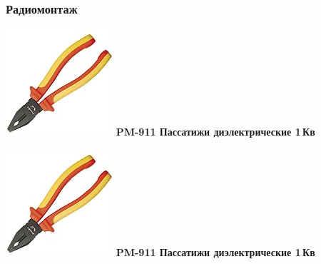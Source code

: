 \documentclass{magazine}
\begin{document}
\begin{multicols}{2}
\subsubsection{Радиомонтаж}

\noindent\includegraphics[width=\columnwidth]{fig/00/pros/PM-911.jpg}
\textbf{PM-911 Пассатижи диэлектрические 1\,Кв}

\noindent\includegraphics[width=\columnwidth]{fig/00/pros/PM-911.jpg}
\textbf{PM-911 Пассатижи диэлектрические 1\,Кв}


\end{multicols}
\end{document}

